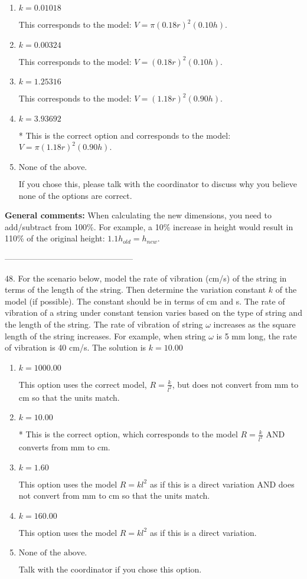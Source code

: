 \documentclass{extbook}[14pt]
\begin{document}
\begin{enumerate}[label=\Alph*.] 
\item $ k = 0.01018 $ 

 This corresponds to the model: $V = \pi (0.18 r)^2 (0.10 h)$. 
\item $ k = 0.00324 $ 

 This corresponds to the model: $V = (0.18 r)^2 (0.10 h)$. 
\item $ k = 1.25316 $ 

 This corresponds to the model: $V = (1.18 r)^2 (0.90 h)$. 
\item $ k = 3.93692 $ 

 * This is the correct option and corresponds to the model: $V = \pi (1.18 r)^2 (0.90 h)$. 
\item $ \text{None of the above.} $ 

 If you chose this, please talk with the coordinator to discuss why you believe none of the options are correct. 
\end{enumerate} 
 
\textbf{General comments:} When calculating the new dimensions, you need to add/subtract from 100\%. For example, a 10\% increase in height would result in 110\% of the original height: $1.1h_{old} = h_{new}$.

-----------------------------------------------

48. For the scenario below, model the rate of vibration (cm/s) of the string in terms of the length of the string. Then determine the variation constant $k$ of the model (if possible). The constant should be in terms of cm and s.
The rate of vibration of a string under constant tension varies based on the type of string and the length of the string. The rate of vibration of string $\omega$ increases as the square length of the string increases. For example, when string $\omega$ is 5 mm long, the rate of vibration is 40 cm/s. 
The solution is $ k = 10.00 $ 

\begin{enumerate}[label=\Alph*.] 
\item $ k = 1000.00 $ 

 This option uses the correct model, $R = \frac{k}{l^{2}}$, but does not convert from mm to cm so that the units match. 
\item $ k = 10.00 $ 

 * This is the correct option, which corresponds to the model $R = \frac{k}{l^{2}}$ AND converts from mm to cm. 
\item $ k = 1.60 $ 

 This option uses the model $R = kl^{2}$ as if this is a direct variation AND does not convert from mm to cm so that the units match. 
\item $ k = 160.00 $ 

 This option uses the model $R = kl^{2}$ as if this is a direct variation. 
\item $ \text{None of the above.} $ 

 Talk with the coordinator if you chose this option. 
\end{enumerate} 
 
\end{document}

